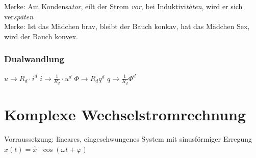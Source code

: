 \documentclass[fs, footer]{latex4ei}
\begin{document}
\begin{multicols*}{4}
    Merke: Am Kondensa\textsl{tor}, eilt der Strom \textsl{vor}, bei Induktivi\textsl{täten}, wird er sich ver\textsl{späten}\\
    Merke: Ist das Mädchen brav, bleibt der Bauch konkav, hat das Mädchen Sex, wird der Bauch konvex.\\

    \subsubsection{Dualwandlung}
    $u \rightarrow R_d\cdot i^d$\qquad
    $i \rightarrow \frac{1}{R_d}\cdot u^d$\qquad
    $\Phi \rightarrow R_d q^d$\qquad
    $q \rightarrow \frac{1}{R_d}\Phi^d$

    \columnbreak
    \section{Komplexe Wechselstromrechnung}
    Vorraussetzung: lineares, eingeschwungenes System mit sinusförmiger Erregung $x(t) = \hat x \cdot \cos(\omega t + \varphi)$\\
\end{multicols*}
\end{document}
